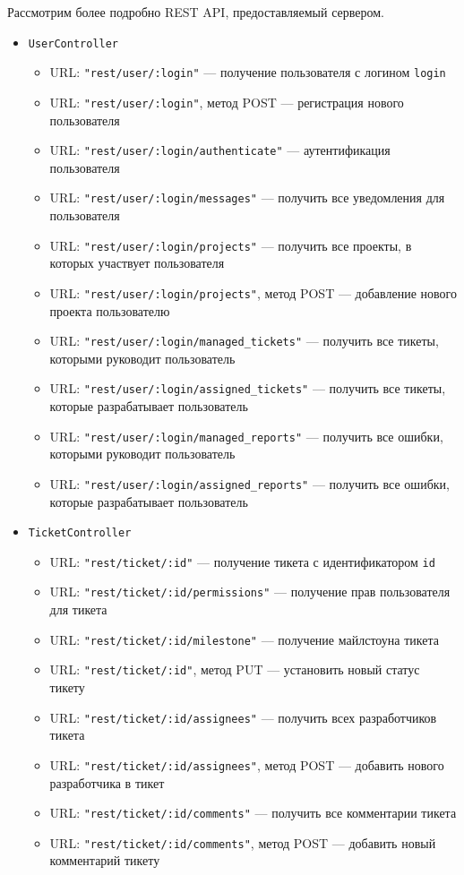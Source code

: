 Рассмотрим более подробно REST API, предоставляемый сервером.
\begin{itemize}
\item \texttt{UserController}
	\begin{itemize}
	\item URL: \texttt{"rest/user/:login"} --- получение пользователя с логином \texttt{login}
	\item URL: \texttt{"rest/user/:login"}, метод POST --- регистрация нового пользователя
	\item URL: \texttt{"rest/user/:login/authenticate"} --- аутентификация пользователя
	\item URL: \texttt{"rest/user/:login/messages"} --- получить все уведомления для пользователя
	\item URL: \texttt{"rest/user/:login/projects"} --- получить все проекты, в которых участвует пользователя
	\item URL: \texttt{"rest/user/:login/projects"}, метод POST --- добавление нового проекта пользователю
	\item URL: \texttt{"rest/user/:login/managed\_tickets"} --- получить все тикеты, которыми руководит пользователь
	\item URL: \texttt{"rest/user/:login/assigned\_tickets"} --- получить все тикеты, которые разрабатывает пользователь
	\item URL: \texttt{"rest/user/:login/managed\_reports"} --- получить все ошибки, которыми руководит пользователь
	\item URL: \texttt{"rest/user/:login/assigned\_reports"} --- получить все ошибки, которые разрабатывает пользователь
	\end{itemize}
	
\item \texttt{TicketController}
	\begin{itemize}
	\item URL: \texttt{"rest/ticket/:id"} --- получение тикета с идентификатором \texttt{id}
	\item URL: \texttt{"rest/ticket/:id/permissions"} --- получение прав пользователя для тикета
	\item URL: \texttt{"rest/ticket/:id/milestone"} --- получение майлстоуна тикета
	\item URL: \texttt{"rest/ticket/:id"}, метод PUT --- установить новый статус тикету
	\item URL: \texttt{"rest/ticket/:id/assignees"} --- получить всех разработчиков тикета
	\item URL: \texttt{"rest/ticket/:id/assignees"}, метод POST --- добавить нового разработчика в тикет
	\item URL: \texttt{"rest/ticket/:id/comments"} --- получить все комментарии тикета
	\item URL: \texttt{"rest/ticket/:id/comments"}, метод POST --- добавить новый комментарий тикету
	\end{itemize}
	

\end{itemize}
